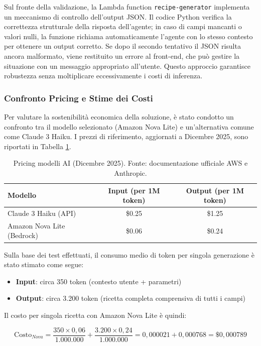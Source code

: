 Sul fronte della validazione, la Lambda function \texttt{recipe-generator} implementa un meccanismo di controllo dell'output JSON. Il codice Python verifica la correttezza strutturale della risposta dell'agente; in caso di campi mancanti o valori nulli, la funzione richiama automaticamente l'agente con lo stesso contesto per ottenere un output corretto. Se dopo il secondo tentativo il JSON risulta ancora malformato, viene restituito un errore al front-end, che può gestire la situazione con un messaggio appropriato all'utente. Questo approccio garantisce robustezza senza moltiplicare eccessivamente i costi di inferenza.

\subsubsection{Confronto Pricing e Stime dei Costi}

Per valutare la sostenibilità economica della soluzione, è stato condotto un confronto tra il modello selezionato (Amazon Nova Lite) e un'alternativa comune come Claude 3 Haiku. I prezzi di riferimento, aggiornati a Dicembre 2025, sono riportati in Tabella \ref{tab:pricing}.

\begin{table}[H]
\centering
\begin{tabular}{|l|c|c|}
\hline
\textbf{Modello} & \textbf{Input (per 1M token)} & \textbf{Output (per 1M token)} \\
\hline
Claude 3 Haiku (API) & \$0.25 & \$1.25 \\
\hline
Amazon Nova Lite (Bedrock) & \$0.06 & \$0.24 \\
\hline
\end{tabular}
\caption{Pricing modelli AI (Dicembre 2025). Fonte: documentazione ufficiale AWS e Anthropic.}
\label{tab:pricing}
\end{table}

Sulla base dei test effettuati, il consumo medio di token per singola generazione è stato stimato come segue:
\begin{itemize}
    \item \textbf{Input}: circa 350 token (contesto utente + parametri)
    \item \textbf{Output}: circa 3.200 token (ricetta completa comprensiva di tutti i campi)
\end{itemize}

Il costo per singola ricetta con Amazon Nova Lite è quindi:

\begin{equation}
\text{Costo}_{Nova} = \frac{350 \times 0,06}{1.000.000} + \frac{3.200 \times 0,24}{1.000.000} = 0,000021 + 0,000768 = \$0,000789
\end{equation}


